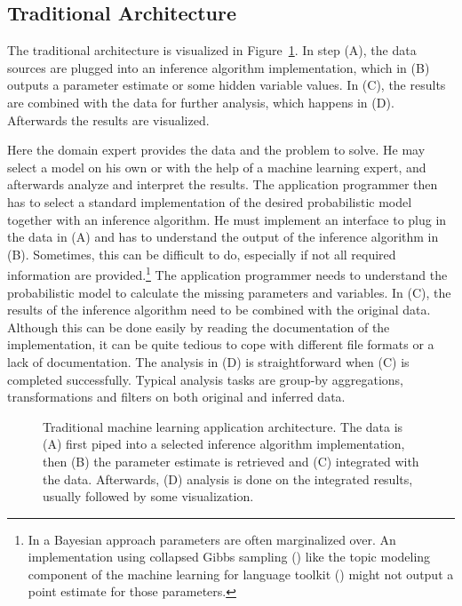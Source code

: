 \subsection{Traditional Architecture}

The traditional architecture is visualized in Figure~\ref{fig:ml-application-architecture}. In step (A), the data sources are plugged into an inference algorithm implementation, which in (B) outputs a parameter estimate or some hidden variable values. In (C), the results are combined with the data for further analysis, which happens in (D). Afterwards the results are visualized.

Here the domain expert provides the data and the problem to solve. He may select a model on his own or with the help of a machine learning expert, and afterwards analyze and interpret the results. The application programmer then has to select a standard implementation of the desired probabilistic model together with an inference algorithm. He must implement an interface to plug in the data in (A) and has to understand the output of the inference algorithm in (B). Sometimes, this can be difficult to do, especially if not all required information are provided.\footnote{In a Bayesian approach parameters are often marginalized over. An implementation using collapsed Gibbs sampling (\cite{liu1994collapsed}) like the topic modeling component of the machine learning for language toolkit (\cite{mccallum2002mallet}) might not output a point estimate for those parameters.} The application programmer needs to understand the probabilistic model to calculate the missing parameters and variables. In (C), the results of the inference algorithm need to be combined with the original data. Although this can be done easily by reading the documentation of the implementation, it can be quite tedious to cope with different file formats or a lack of documentation. The analysis in (D) is straightforward when (C) is completed successfully. Typical analysis tasks are group-by aggregations, transformations and filters on both original and inferred data.

\begin{figure}[t]
\centering
\scalebox{\tikzScale}{\adjustTikzSize }
\caption[Traditional machine learning application architecture]{Traditional machine learning application architecture. The data is (A) first piped into a selected inference algorithm implementation, then (B) the parameter estimate is retrieved and (C) integrated with the data. Afterwards, (D) analysis is done on the integrated results, usually followed by some visualization.}\label{fig:ml-application-architecture}
\end{figure}

